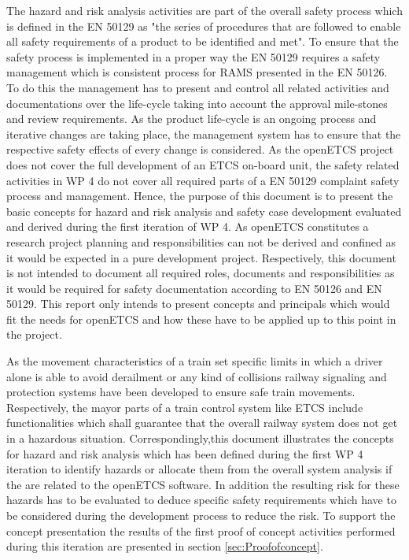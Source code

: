 \documentclass{template/openetcs_report}
\begin{document}
The hazard and risk analysis activities are part of the overall safety process which is defined in the EN 50129 as "the series of procedures that are followed to enable all safety requirements of a product to be identified and met". To ensure that the safety process is implemented in a proper way the EN 50129 requires a safety management which is consistent process for RAMS presented in the EN 50126. To do this the management has to present and control all related activities and documentations over the life-cycle taking into account the approval mile-stones and review requirements. As the product life-cycle is an ongoing process and iterative changes are taking place, the management system has to ensure that the respective safety effects of every change is considered. As the openETCS project does not cover the full development of an ETCS on-board unit, the safety related activities in WP 4 do not cover all required parts of a EN 50129 complaint safety process and management. Hence, the purpose of this document is to present the basic concepts for hazard and risk analysis and safety case development evaluated and derived during the first iteration of WP 4. As openETCS constitutes a research project planning and responsibilities can not be derived and confined as it would be expected in a pure development project. Respectively, this document is not intended to document all required roles, documents and responsibilities as it would be required for safety documentation according to EN 50126 and EN 50129. This report only intends to present concepts and principals which would fit the needs for openETCS and how these have to be applied up to this point in the project.

As the movement characteristics of a train set specific limits in which a driver alone is able to avoid derailment or any kind of collisions railway signaling and protection systems have been developed to ensure safe train movements. Respectively, the mayor parts of a train control system like ETCS include functionalities which shall guarantee that the overall railway system does not get in a hazardous situation. Correspondingly,this document illustrates the concepts for hazard and risk analysis which has been defined during the first WP 4 iteration to identify hazards or allocate them from the overall system analysis if the are related to the openETCS software. In addition the resulting risk for these hazards has to be evaluated to deduce specific safety requirements which have to be considered during the development process to reduce the risk. To support the concept presentation the results of the first proof of concept activities performed during this iteration are presented in section \ref{sec:Proofofconcept}.
\end{document}
